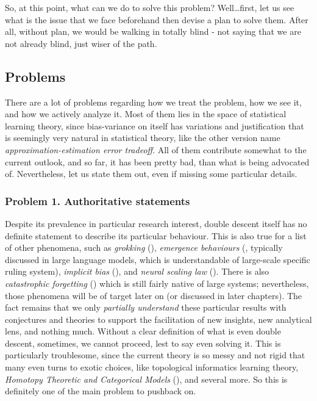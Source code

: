 \documentclass[10pt]{article}
\begin{document}
So, at this point, what can we do to solve this problem? Well\dots first, let us see what is the issue that we face beforehand then devise a plan to solve them. After all, without plan, we would be walking in totally blind - not saying that we are not already blind, just wiser of the path. 

\subsection{Problems}
There are a lot of problems regarding how we treat the problem, how we see it, and how we actively analyze it. Most of them lies in the space of statistical learning theory, since bias-variance on itself has variations and justification that is seemingly very natural in statistical theory, like the other version name \textit{approximation-estimation error tradeoff}. All of them contribute somewhat to the current outlook, and so far, it has been pretty bad, than what is being advocated of. Nevertheless, let us state them out, even if missing some particular details. 

\subsubsection*{Problem 1. Authoritative statements}
Despite its prevalence in particular research interest, double descent itself has no definite statement to describe its particular behaviour. This is also true for a list of other phenomena, such as \textit{grokking} (\cite{power2022grokkinggeneralizationoverfittingsmall}), \textit{emergence behaviours} (\cite{wei2022emergentabilitieslargelanguage}, typically discussed in large language models, which is understandable of large-scale specific ruling system), \textit{implicit bias} (\cite{soudry2024implicitbiasgradientdescent}), and \textit{neural scaling law} (\cite{kaplan2020scalinglawsneurallanguage,wei2022emergentabilitieslargelanguage}). There is also \textit{catastrophic forgetting} (\cite{vandeven2024continuallearningcatastrophicforgetting}) which is still fairly native of large systems; nevertheless, those phenomena will be of target later on (or discussed in later chapters). The fact remains that we only \textit{partially understand} these particular results with conjectures and theories to support the facilitation of new insights, new analytical lens, and nothing much. Without a clear definition of what is even double descent, sometimes, we cannot proceed, lest to say even solving it. This is particularly troublesome, since the current theory is so messy and not rigid that many even turns to exotic choices, like topological informatics learning theory, \textit{Homotopy Theoretic and Categorical Models} (\cite{Manin_2024}), and several more. So this is definitely one of the main problem to pushback on. 
\end{document}
